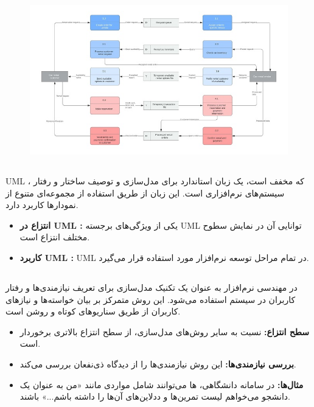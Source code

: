 \begin{figure}[H]
	\centering
	\includegraphics{pic8.png}
	\label{fig:label4}
\end{figure}

\subsection*{}
UML ، که مخفف  است، یک زبان استاندارد برای مدل‌سازی و توصیف ساختار و رفتار سیستم‌های نرم‌افزاری است. این زبان از طریق استفاده از مجموعه‌ای متنوع از نمودارها کاربرد دارد.

\begin{itemize}
	\item \textbf{انتزاع در UML :} یکی از ویژگی‌های برجسته UML توانایی آن در نمایش سطوح مختلف انتزاع است.
	\item \textbf{کاربرد UML :} UML در تمام مراحل توسعه نرم‌افزار مورد استفاده قرار می‌گیرد.
\end{itemize}


\subsection*{}
 در مهندسی نرم‌افزار به عنوان یک تکنیک مدل‌سازی برای تعریف نیازمندی‌ها و رفتار کاربران در سیستم استفاده می‌شود. این روش متمرکز بر بیان خواسته‌ها و نیازهای کاربران از طریق سناریوهای کوتاه و روشن است.

\begin{itemize}
	\item \textbf{سطح انتزاع:}  نسبت به سایر روش‌های مدل‌سازی، از سطح انتزاع بالاتری برخوردار است.
	\item \textbf{بررسی نیازمندی‌ها:} این روش نیازمندی‌ها را از دیدگاه ذی‌نفعان بررسی می‌کند.
	\item \textbf{مثال‌ها:} در سامانه دانشگاهی، 
	ها می‌توانند شامل مواردی مانند «من به عنوان یک دانشجو می‌خواهم لیست تمرین‌ها و ددلاین‌های آن‌ها را داشته باشم...» باشند.
\end{itemize}

